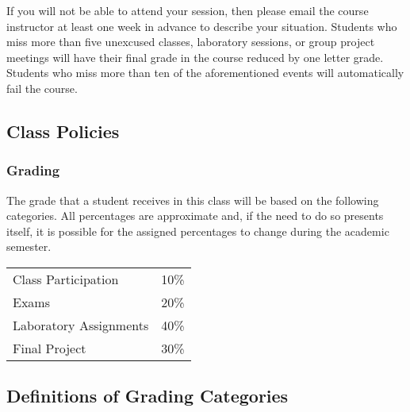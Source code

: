 \documentclass[11pt]{article} %
\begin{document}
If you will not be able to attend your session, then please email the course instructor at least one week in advance to describe your situation.  Students who miss more than five unexcused classes, laboratory sessions, or group project meetings will have their final grade in the course reduced by one letter grade. Students who miss more than ten of the aforementioned events will automatically fail the course.
\color{black}








\subsection*{\textbf{Class Policies}}

\subsubsection*{\textbf{Grading}}

The grade that a student receives in this class will be based on the following categories. All percentages are approximate and, if the need to do so presents itself, it is possible for the assigned percentages to change during the academic semester. 
\color{red}
\begin{center}
  \begin{tabular}{l|l}
\hline
    Class Participation & 10\% \\  %
    Exams & 20\% \\
    Laboratory  Assignments & 40\% \\
    Final Project & 30\% \\
\hline
  \end{tabular}
\end{center}
\color{black}
\noindent

\noindent
\subsection*{\textbf{Definitions of Grading Categories}}
\vspace*{-.05in}
\end{document}
